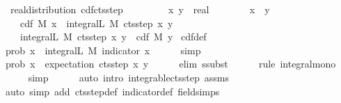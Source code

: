 \documentclass[leqno]{article}
\theoremstyle{definition}
\begin{document}
\medskip

\begin{isabellebody}
\isamarkupfalse%
\ {\isacharparenleft}\ real{\isacharunderscore}distribution{\isacharparenright}\ cdf{\isacharunderscore}cts{\isacharunderscore}step{\isacharcolon}\isanewline
\ \ \ \ \isanewline
\ \ \ \ x\ y\ {\isacharcolon}{\isacharcolon}\ real\isanewline
\ \ \ \isanewline
\ \ \ \ {\isachardoublequoteopen}x\ {\isacharless}\ y{\isachardoublequoteclose}\isanewline
\ \ \ \isanewline
\ \ \ \ {\isachardoublequoteopen}cdf\ M\ x\ {\isasymle}\ integral\isactrlsup L\ M\ {\isacharparenleft}cts{\isacharunderscore}step\ x\ y{\isacharparenright}{\isachardoublequoteclose}\ \isanewline
\ \ \ \ {\isachardoublequoteopen}integral\isactrlsup L\ M\ {\isacharparenleft}cts{\isacharunderscore}step\ x\ y{\isacharparenright}\ {\isasymle}\ cdf\ M\ y{\isachardoublequoteclose}\isanewline
{}\isamarkupfalse%
\ cdf{\isacharunderscore}def\ \isanewline
{}\isamarkupfalse%
\ {\isacharminus}\isanewline
\ \ \isamarkupfalse%
\ {\isachardoublequoteopen}prob\ {\isacharbraceleft}{\isachardot}{\isachardot}x{\isacharbraceright}\ {\isacharequal}\ integral\isactrlsup L\ M\ {\isacharparenleft}indicator\ {\isacharbraceleft}{\isachardot}{\isachardot}x{\isacharbraceright}{\isacharparenright}{\isachardoublequoteclose}\isanewline
\ \ \ \ \isamarkupfalse%
\ simp\isanewline
\ \ \isamarkupfalse%
\ {\isachardoublequoteopen}prob\ {\isacharbraceleft}{\isachardot}{\isachardot}x{\isacharbraceright}\ {\isasymle}\ expectation\ {\isacharparenleft}cts{\isacharunderscore}step\ x\ y{\isacharparenright}{\isachardoublequoteclose}\isanewline
\ \ \ \ \isamarkupfalse%
\ {\isacharparenleft}elim\ ssubst{\isacharparenright}\isanewline
\ \ \ \ \isamarkupfalse%
\ {\isacharparenleft}rule\ integral{\isacharunderscore}mono{\isacharparenright}\isanewline
\ \ \ \ \isamarkupfalse%
\ simp\isanewline
\ \ \ \ \isamarkupfalse%
\ {\isacharparenleft}auto\ intro{\isacharbang}{\isacharcolon}\ integrable{\isacharunderscore}cts{\isacharunderscore}step\ assms{\isacharparenright}\ {\isacharbrackleft}{\isacharbrackright}\isanewline
\ \ \ \ \isamarkupfalse%
\ {\isacharparenleft}auto\ simp\ add{\isacharcolon}\ cts{\isacharunderscore}step{\isacharunderscore}def\ indicator{\isacharunderscore}def\ field{\isacharunderscore}simps{\isacharparenright}\isanewline
\ \ \ \ \isamarkupfalse%

\end{isabellebody}
\end{document}
